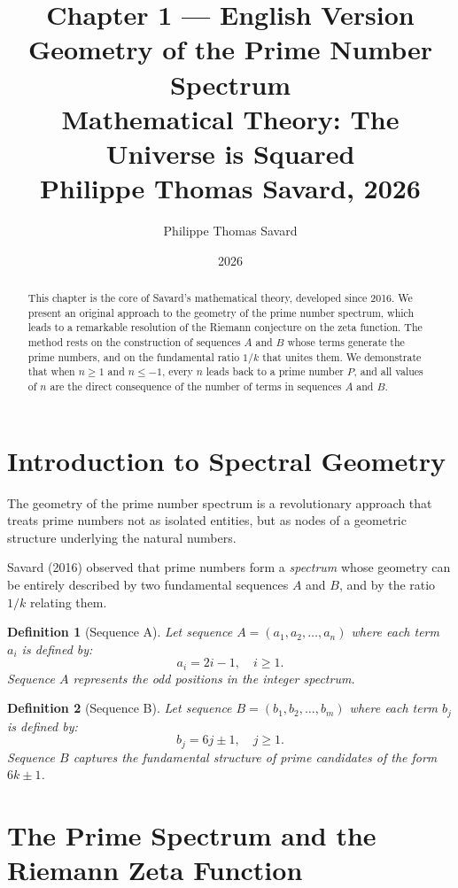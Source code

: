 \documentclass[12pt,a4paper]{article}
\title{%
  \textbf{Chapter 1 — English Version}\\[0.5em]
  \Large Geometry of the Prime Number Spectrum\\[0.5em]
  \large Mathematical Theory: The Universe is Squared\\[0.5em]
  \normalsize Philippe Thomas Savard, 2026
}
\author{Philippe Thomas Savard}
\date{2026}
\newtheorem{definition}{Definition}
\begin{document}
\maketitle
\tableofcontents
\newpage

\begin{abstract}
This chapter is the core of Savard's mathematical theory, developed since 2016.
We present an original approach to the geometry of the prime number spectrum,
which leads to a remarkable resolution of the Riemann conjecture on the zeta
function. The method rests on the construction of sequences $A$ and $B$ whose
terms generate the prime numbers, and on the fundamental ratio $1/k$ that unites them.
We demonstrate that when $n \geq 1$ and $n \leq -1$, every $n$ leads back to a
prime number $P$, and all values of $n$ are the direct consequence of the number
of terms in sequences $A$ and $B$.
\end{abstract}

\section{Introduction to Spectral Geometry}

The geometry of the prime number spectrum is a revolutionary approach that treats
prime numbers not as isolated entities, but as nodes of a geometric structure
underlying the natural numbers.

Savard (2016) observed that prime numbers form a \emph{spectrum} whose geometry
can be entirely described by two fundamental sequences $A$ and $B$, and by the
ratio $1/k$ relating them.

\begin{definition}[Sequence A]
Let sequence $A = (a_1, a_2, \ldots, a_n)$ where each term $a_i$ is defined by:
\[
  a_i = 2i - 1, \quad i \geq 1.
\]
Sequence $A$ represents the odd positions in the integer spectrum.
\end{definition}

\begin{definition}[Sequence B]
Let sequence $B = (b_1, b_2, \ldots, b_m)$ where each term $b_j$ is defined by:
\[
  b_j = 6j \pm 1, \quad j \geq 1.
\]
Sequence $B$ captures the fundamental structure of prime candidates of the form $6k \pm 1$.
\end{definition}

\section{The Prime Spectrum and the Riemann Zeta Function}
\end{document}
